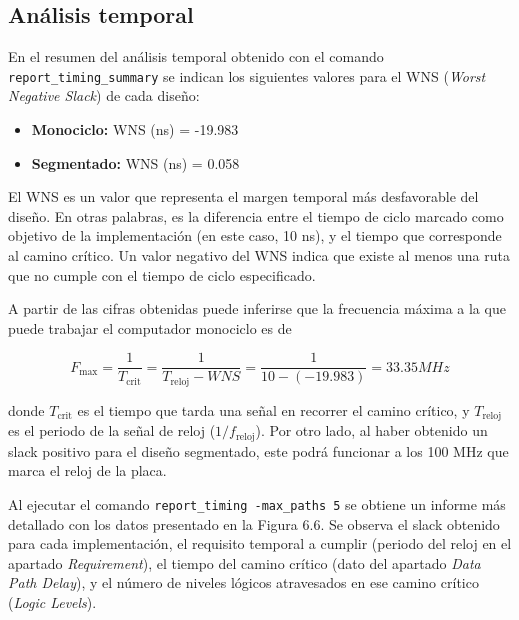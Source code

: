 \subsection{Análisis temporal}

En el resumen del análisis temporal obtenido con el comando \texttt{report\_timing\_summary} se indican los siguientes valores para el WNS (\textit{Worst Negative Slack}) de cada diseño:

\begin{itemize}
  \item \textbf{Monociclo:} WNS (ns) = -19.983
  \item \textbf{Segmentado:} WNS (ns) = 0.058
\end{itemize}

El WNS es un valor que representa el margen temporal más desfavorable del diseño. En otras palabras, es la diferencia entre el tiempo de ciclo marcado como objetivo de la implementación (en este caso, 10 ns), y el tiempo que corresponde al camino crítico. Un valor negativo del WNS indica que existe al menos una ruta que no cumple con el tiempo de ciclo especificado.

A partir de las cifras obtenidas puede inferirse que la frecuencia máxima a la que puede trabajar el computador monociclo es de

\[
F_{\text{max}}=
\frac{1}{T_{\text{crit}}}
=
\frac{1}{T_{\text{reloj}}-WNS}
=
\frac{1}{10-(-19.983)}
=
33.35 MHz
\]

donde $T_{\text{crit}}$ es el tiempo que tarda una señal en recorrer el camino crítico, y $T_{\text{reloj}}$ es el periodo de la señal de reloj ($1/f_{\text{reloj}}$). Por otro lado, al haber obtenido un slack positivo para el diseño segmentado, este podrá funcionar a los 100 MHz que marca el reloj de la placa.

Al ejecutar el comando \texttt{report\_timing -max\_paths 5} se obtiene un informe más detallado con los datos presentado en la Figura 6.6. Se observa el slack obtenido para cada implementación, el requisito temporal a cumplir (periodo del reloj en el apartado \textit{Requirement}), el tiempo del camino crítico (dato del apartado \textit{Data Path Delay}), y el número de niveles lógicos atravesados en ese camino crítico (\textit{Logic Levels}).

